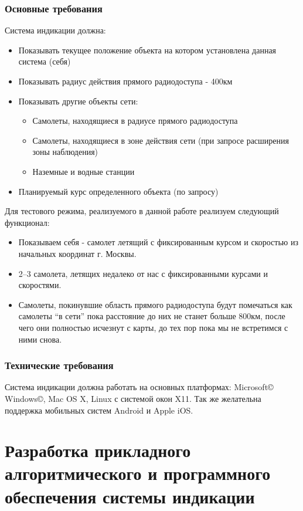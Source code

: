 \documentclass[a4paper,12pt]{report} %
\begin{document}
\subsection{Основные требования}

Система индикации должна:
\begin{itemize}
\item Показывать текущее положение объекта на котором установлена данная система
  (себя)
\item Показывать радиус действия прямого радиодоступа - 400км
\item Показывать другие объекты сети:
  \begin{itemize}
  \item Самолеты, находящиеся в радиусе прямого радиодоступа
  \item Самолеты, находящиеся в зоне действия сети (при запросе расширения зоны
    наблюдения)
  \item Наземные и водные станции
  \end{itemize}
\item Планируемый курс определенного объекта (по запросу)
\end{itemize}

Для тестового режима, реализуемого в данной работе реализуем следующий
функционал:
\begin{itemize}
\item Показываем себя - самолет летящий с фиксированным курсом и скоростью из
  начальных координат г. Москвы.
\item 2--3 самолета, летящих недалеко от нас с фиксированными курсами и
  скоростями.
\item Самолеты, покинувшие область прямого радиодоступа будут помечаться как
  самолеты ``в сети'' пока расстояние до них не станет больше 800км, после чего
  они полностью исчезнут с карты, до тех пор пока мы не встретимся с ними снова.
\end{itemize}

\subsection{Технические требования}

Система индикации должна работать на основных платформах: Microsoft\copyright
Windows\copyright, Mac OS X, Linux с системой окон X11. Так же желательна
поддержка мобильных систем Android и Apple iOS.
\newpage

\chapter{Разработка прикладного алгоритмического и  программного
  обеспечения  системы индикации} %
\end{document}
